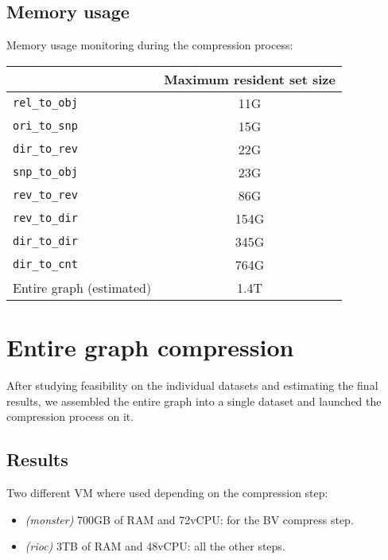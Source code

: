 \documentclass[11pt,a4paper]{article}
\begin{document}
\subsection{Memory usage}

Memory usage monitoring during the compression process:

\begin{center}
    \begin{tabular}{@{} l c @{}}
        \toprule
        \multicolumn{1}{c}{} &
            \textbf{Maximum resident set size} \\
        \midrule
        \texttt{rel\_to\_obj} & 11G \\
        \texttt{ori\_to\_snp} & 15G \\
        \texttt{dir\_to\_rev} & 22G \\
        \texttt{snp\_to\_obj} & 23G \\
        \texttt{rev\_to\_rev} & 86G \\
        \texttt{rev\_to\_dir} & 154G \\
        \texttt{dir\_to\_dir} & 345G \\
        \texttt{dir\_to\_cnt} & 764G \\
        \midrule
        Entire graph (estimated) & 1.4T \\
        \bottomrule
    \end{tabular}
\end{center}

\section{Entire graph compression}

After studying feasibility on the individual datasets and estimating the final
results, we assembled the entire graph into a single dataset and launched the
compression process on it.

\subsection{Results}

Two different VM where used depending on the compression step:

\begin{itemize}
    \item \textit{(monster)} 700GB of RAM and 72vCPU: for the BV compress step.
    \item \textit{(rioc)} 3TB of RAM and 48vCPU: all the other steps.
\end{itemize}
\end{document}
